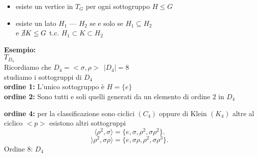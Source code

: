 \documentclass[12px]{article}
\begin{document}
{\begin{defi}
		\begin{itemize}
			\item esiste un vertice in $T_G$ per ogni sottogruppo $H\leq G$ \\
			\item esiste un lato $H_1$ \---- $H_2$ se e solo se $H_1\subseteq H_2$ \\e $\cancel\exists K\leq G$ t.c. $H_1\subset K\subset H_2$
		\end{itemize}
	\end{defi}
	\textbf{Esempio:}\\
	$T_{D_4}$\\
	Ricordiamo che $D_4 = <\sigma,\rho>  \ \ |D_4|=8$\\
	studiamo i sottogruppi di $D_4$\\
	\textbf{ordine 1:} L'unico sottogruppo è $H=\{e\}$\\
	 \textbf{ordine 2:} Sono tutti e soli quelli generati da un elemento di ordine $2$ in $D_4$
	 \begin{center}
	 \end{center}
	 \textbf{ordine 4:} per la classificazione sono ciclici $(C_4)$ oppure di Klein $(K_4)$ altre al ciclico $<p>$ esistono altri sottogruppi\\
	 \[
		 \langle \rho^2,\sigma\rangle = \{e, \sigma,\rho^2,\sigma\rho^2\}
	 .\] 
	 \[
		 \rangle\rho^2, \sigma\rho\rangle = \{e,\sigma\rho, \rho^2,\sigma\rho^3\}
	 .\]
	 Ordine 8: $D_4$\\
	 \begin{center}
\end{center}}
\end{document}
